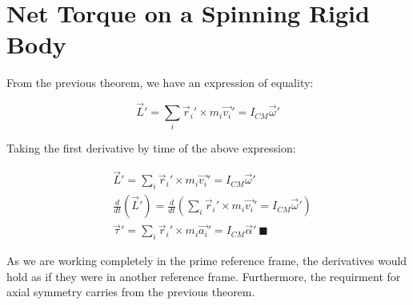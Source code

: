 \documentclass[letterpaper]{article}
\begin{document}
\section{Net Torque on a Spinning Rigid Body}
\label{sec:org6a32e27}
From the previous theorem, we have an expression of equality:

\begin{equation}
    \vec{L}' = \sum_i \vec{r}_i' \times m_i \vec{v_i}'= I_{CM} \vec{\omega}' 
\end{equation}

Taking the first derivative by time of the above expression:

\begin{align}
    &\vec{L}' = \sum_i \vec{r}_i' \times m_i \vec{v_i}'= I_{CM} \vec{\omega}'\\
    &\frac{d}{dt}\left(\vec{L}'\right) = \frac{d}{dt}\left(\sum_i \vec{r}_i' \times m_i \vec{v_i}'= I_{CM} \vec{\omega}'\right)\\
    &\vec{\tau}' = \sum_i \vec{r}_i' \times m_i \vec{a_i}'= I_{CM} \vec{\alpha}'\ \blacksquare
\end{align}

As we are working completely in the prime reference frame, the derivatives would hold as if they were in another reference frame. Furthermore, the requirment for axial symmetry carries from the previous theorem.
\end{document}
